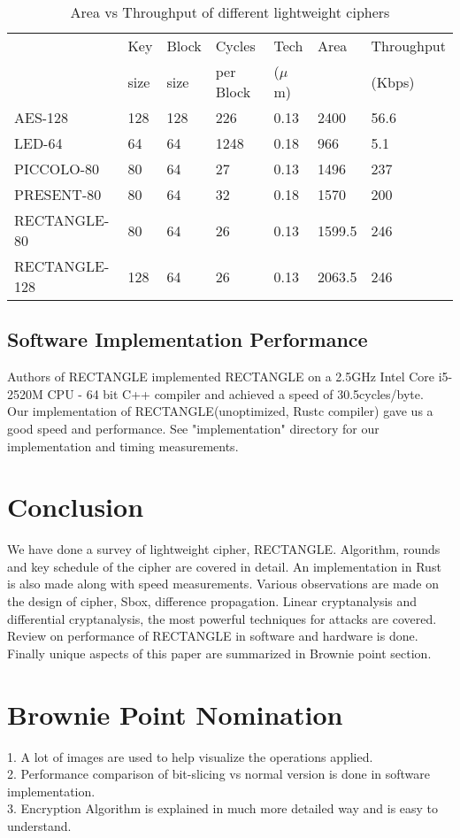 \documentclass[final]{transcrypto}
\begin{document}
\begin{table}[H]
	\centering
	\caption{Area vs Throughput of different lightweight ciphers}
	\begin{tabular}{|l||l|l|l|l|l|l|}
		\hline
&Key & Block& Cycles& Tech & Area & Throughput\\
&size &size & per Block &($\mu$m) &  & (Kbps)\\ \hline \hline
AES-128 & 128 & 128 & 226 & 0.13 & 2400 & 56.6\\\hline
LED-64 & 64 & 64 & 1248 & 0.18 & 966 & 5.1\\\hline
PICCOLO-80 & 80 & 64 & 27 & 0.13 & 1496 & 237 \\\hline
PRESENT-80 &  80 &  64 & 32 & 0.18 & 1570 & 200 \\\hline
RECTANGLE-80 & 80 &  64 & 26 & 0.13 & 1599.5 & 246 \\\hline
RECTANGLE-128 & 128 & 64 & 26 & 0.13 & 2063.5 & 246 \\
\hline
	\end{tabular}
	\label{table:compar}
\end{table}
\subsection{Software Implementation Performance}
Authors of RECTANGLE implemented RECTANGLE on a 2.5GHz Intel Core i5-2520M CPU - 64 bit C++ compiler and achieved a speed of 30.5cycles/byte.\cite{rectangle}\\
Our implementation of RECTANGLE(unoptimized, Rustc compiler) gave us a good speed and performance. See "implementation" directory for our implementation and timing measurements.
\section{Conclusion}
We have done a survey of lightweight cipher, RECTANGLE. Algorithm, rounds and key schedule of the cipher are covered in detail. An implementation in Rust is also made along with speed measurements. Various observations are made on the design of cipher, Sbox, difference propagation. Linear cryptanalysis and differential cryptanalysis, the most powerful techniques for attacks are covered. Review on performance of RECTANGLE in software and hardware is done. Finally unique aspects of this paper are summarized in Brownie point section.
\section{Brownie Point Nomination}
1. A lot of images are used to help visualize the operations applied.\\
2. Performance comparison of bit-slicing vs normal version is done in software implementation.\\
3. Encryption Algorithm is explained in much more detailed way and is easy to understand.\\
\end{document}
